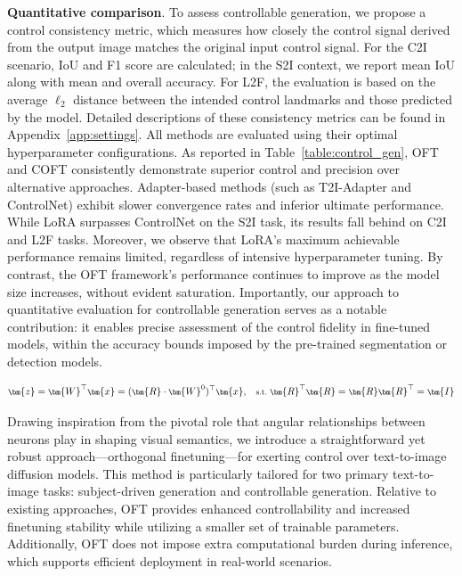 \textbf{Quantitative comparison}. To assess controllable generation, we propose a control consistency metric, which measures how closely the control signal derived from the output image matches the original input control signal. For the C2I scenario, IoU and F1 score are calculated; in the S2I context, we report mean IoU along with mean and overall accuracy. For L2F, the evaluation is based on the average $\ell_2$ distance between the intended control landmarks and those predicted by the model. Detailed descriptions of these consistency metrics can be found in Appendix~\ref{app:settings}. All methods are evaluated using their optimal hyperparameter configurations. As reported in Table~\ref{table:control_gen}, OFT and COFT consistently demonstrate superior control and precision over alternative approaches. Adapter-based methods (such as T2I-Adapter and ControlNet) exhibit slower convergence rates and inferior ultimate performance. While LoRA surpasses ControlNet on the S2I task, its results fall behind on C2I and L2F tasks. Moreover, we observe that LoRA’s maximum achievable performance remains limited, regardless of intensive hyperparameter tuning. By contrast, the OFT framework’s performance continues to improve as the model size increases, without evident saturation. Importantly, our approach to quantitative evaluation for controllable generation serves as a notable contribution: it enables precise assessment of the control fidelity in fine-tuned models, within the accuracy bounds imposed by the pre-trained segmentation or detection models.

\begin{equation}\label{eq:oft_general}
    \footnotesize
    \bm{z} = \bm{W}^\top\bm{x} = (\bm{R} \cdot \bm{W}^0)^\top\bm{x},~~~\text{s.t.}~\bm{R}^\top\bm{R} = \bm{R}\bm{R}^\top = \bm{I}
\end{equation}

Drawing inspiration from the pivotal role that angular relationships between neurons play in shaping visual semantics, we introduce a straightforward yet robust approach—orthogonal finetuning—for exerting control over text-to-image diffusion models. This method is particularly tailored for two primary text-to-image tasks: subject-driven generation and controllable generation. Relative to existing approaches, OFT provides enhanced controllability and increased finetuning stability while utilizing a smaller set of trainable parameters. Additionally, OFT does not impose extra computational burden during inference, which supports efficient deployment in real-world scenarios.

